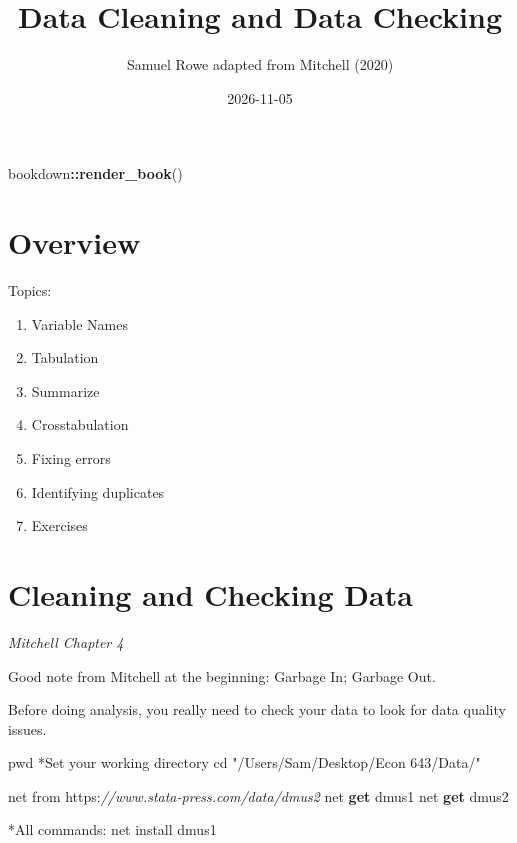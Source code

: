 \documentclass[
]{book}
\title{Data Cleaning and Data Checking}
\author{Samuel Rowe adapted from Mitchell (2020)}
\date{2026-11-05}
\newenvironment{Shaded}{\begin{snugshade}}{\end{snugshade}}
\newcommand{\CommentTok}[1]{\textcolor[rgb]{0.56,0.35,0.01}{\textit{#1}}}
\newcommand{\FunctionTok}[1]{\textcolor[rgb]{0.13,0.29,0.53}{\textbf{#1}}}
\newcommand{\NormalTok}[1]{#1}
\newcommand{\SpecialCharTok}[1]{\textcolor[rgb]{0.81,0.36,0.00}{\textbf{#1}}}
\newcommand{\StringTok}[1]{\textcolor[rgb]{0.31,0.60,0.02}{#1}}
\providecommand{\tightlist}{%
  \setlength{\itemsep}{0pt}\setlength{\parskip}{0pt}}
\begin{document}
\maketitle

{
\setcounter{tocdepth}{1}
\tableofcontents
}
\begin{Shaded}
\begin{Highlighting}[]
\NormalTok{bookdown}\SpecialCharTok{::}\FunctionTok{render\_book}\NormalTok{()}
\end{Highlighting}
\end{Shaded}

\chapter*{Overview}\label{overview}

Topics:

\begin{enumerate}
\def\labelenumi{\arabic{enumi}.}
\tightlist
\item
  Variable Names
\item
  Tabulation
\item
  Summarize
\item
  Crosstabulation
\item
  Fixing errors
\item
  Identifying duplicates
\item
  Exercises
\end{enumerate}

\chapter{Cleaning and Checking Data}\label{cleaning-and-checking-data}

\emph{Mitchell Chapter 4}

Good note from Mitchell at the beginning: Garbage In; Garbage Out.

Before doing analysis, you really need to check your data to look for data quality issues.

\begin{Shaded}
\begin{Highlighting}[]
\NormalTok{pwd}
\NormalTok{*Set your working directory}
\NormalTok{cd }\StringTok{"/Users/Sam/Desktop/Econ 643/Data/"}

\NormalTok{net from https:}\CommentTok{//www.stata{-}press.com/data/dmus2}
\NormalTok{net }\FunctionTok{get}\NormalTok{ dmus1}
\NormalTok{net }\FunctionTok{get}\NormalTok{ dmus2}

\NormalTok{*All commands:}
\NormalTok{net install dmus1}
\end{Highlighting}
\end{Shaded}
\end{document}
